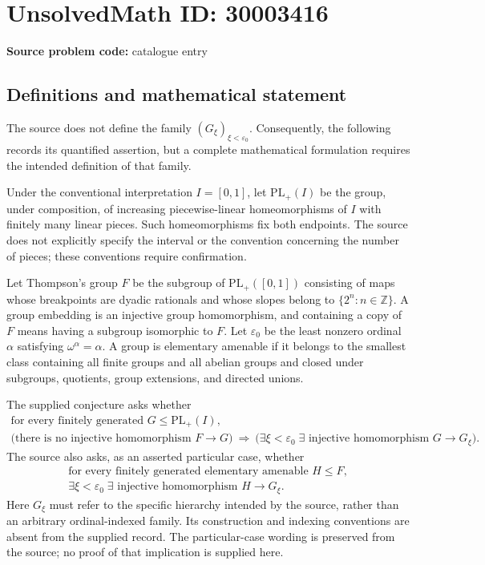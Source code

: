 \documentclass[11pt]{article}
\newcommand{\Z}{\mathbb{Z}}
\begin{document}
\section*{UnsolvedMath ID: 30003416}
\textbf{Source problem code:} catalogue entry
\subsection{Definitions and mathematical statement}
The source does not define the family \((G_\xi)_{\xi<\varepsilon_0}\). Consequently, the following records its quantified assertion, but a complete mathematical formulation requires the intended definition of that family.

Under the conventional interpretation \(I=[0,1]\), let \(\mathrm{PL}_+(I)\) be the group, under composition, of increasing piecewise-linear homeomorphisms of \(I\) with finitely many linear pieces. Such homeomorphisms fix both endpoints. The source does not explicitly specify the interval or the convention concerning the number of pieces; these conventions require confirmation.

Let Thompson's group \(F\) be the subgroup of \(\mathrm{PL}_+([0,1])\) consisting of maps whose breakpoints are dyadic rationals and whose slopes belong to \(\{2^n:n\in\Z\}\). A group embedding is an injective group homomorphism, and containing a copy of \(F\) means having a subgroup isomorphic to \(F\). Let \(\varepsilon_0\) be the least nonzero ordinal \(\alpha\) satisfying \(\omega^\alpha=\alpha\). A group is elementary amenable if it belongs to the smallest class containing all finite groups and all abelian groups and closed under subgroups, quotients, group extensions, and directed unions.

The supplied conjecture asks whether
\[
\begin{gathered}
\text{for every finitely generated }G\leq\mathrm{PL}_+(I),\\
\bigl(\text{there is no injective homomorphism }F\to G\bigr)
\ \Longrightarrow\ 
\bigl(\exists\xi<\varepsilon_0\;\exists\text{ injective homomorphism }G\to G_\xi\bigr).
\end{gathered}
\]
The source also asks, as an asserted particular case, whether
\[
\begin{gathered}
\text{for every finitely generated elementary amenable }H\leq F,\\
\exists\xi<\varepsilon_0\;\exists\text{ injective homomorphism }H\to G_\xi.
\end{gathered}
\]
Here \(G_\xi\) must refer to the specific hierarchy intended by the source, rather than an arbitrary ordinal-indexed family. Its construction and indexing conventions are absent from the supplied record. The particular-case wording is preserved from the source; no proof of that implication is supplied here.
\end{document}
